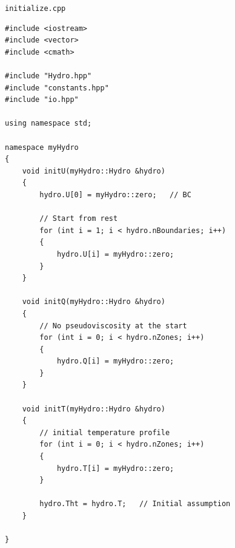 \documentclass[12pt]{article}
\begin{document}
\pagebreak
\texttt{initialize.cpp}
\begin{Verbatim}[fontsize=\small]
#include <iostream>
#include <vector>
#include <cmath>

#include "Hydro.hpp"
#include "constants.hpp"
#include "io.hpp"

using namespace std;

namespace myHydro
{
    void initU(myHydro::Hydro &hydro)
    {
        hydro.U[0] = myHydro::zero;   // BC

        // Start from rest
        for (int i = 1; i < hydro.nBoundaries; i++)
        {
            hydro.U[i] = myHydro::zero;
        }
    }

    void initQ(myHydro::Hydro &hydro)
    {
        // No pseudoviscosity at the start
        for (int i = 0; i < hydro.nZones; i++)
        {
            hydro.Q[i] = myHydro::zero;
        }
    }

    void initT(myHydro::Hydro &hydro)
    {
        // initial temperature profile
        for (int i = 0; i < hydro.nZones; i++)
        {
            hydro.T[i] = myHydro::zero;
        }

        hydro.Tht = hydro.T;   // Initial assumption
    }

}
\end{Verbatim}
\end{document}
